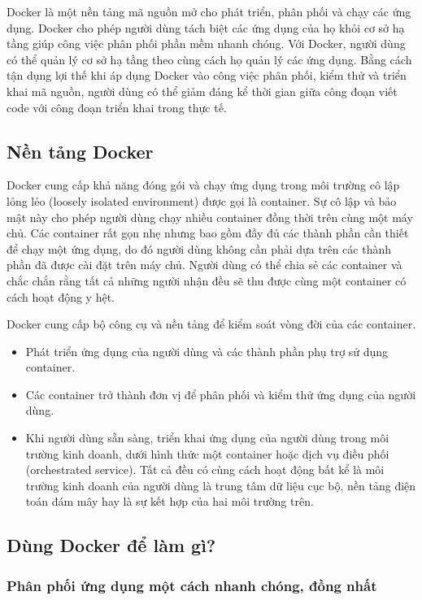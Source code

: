 Docker\autocite{docker} là một nền tảng mã nguồn mở cho phát triển, phân phối và chạy các ứng dụng. Docker cho phép người dùng tách biệt các ứng dụng của họ khỏi cơ sở hạ tầng giúp công việc phân phối phần mềm nhanh chóng. Với Docker, người dùng có thể quản lý cơ sở hạ tầng theo cùng cách họ quản lý các ứng dụng. Bằng cách tận dụng lợi thế khi áp dụng Docker vào công việc phân phối, kiểm thử và triển khai mã nguồn, người dùng có thể giảm đáng kể thời gian giữa công đoạn viết code với công đoạn triển khai trong thực tế.

\subsection{Nền tảng Docker}

Docker cung cấp khả năng đóng gói và chạy ứng dụng trong môi trường cô lập lỏng lẻo (loosely isolated environment) được gọi là container. Sự cô lập và bảo mật này cho phép người dùng chạy nhiều container đồng thời trên cùng một máy chủ. Các container rất gọn nhẹ nhưng bao gồm đầy đủ các thành phần cần thiết để chạy một ứng dụng, do đó người dùng không cần phải dựa trên các thành phần đã được cài đặt trên máy chủ. Người dùng có thể chia sẻ các container và chắc chắn rằng tất cả những người nhận đều sẽ thu được cùng một container có cách hoạt động y hệt.

Docker cung cấp bộ công cụ và nền tảng để kiểm soát vòng đời của các container.

\begin{itemize}
    \item Phát triển ứng dụng của người dùng và các thành phần phụ trợ sử dụng container.
    \item Các container trở thành đơn vị để phân phối và kiểm thử ứng dụng của người dùng.
    \item Khi người dùng sẵn sàng, triển khai ứng dụng của người dùng trong môi trường kinh doanh, dưới hình thức một container hoặc dịch vụ điều phối (orchestrated service). Tất cả đều có cùng cách hoạt động bất kể là môi trường kinh doanh của người dùng là trung tâm dữ liệu cục bộ, nền tảng điện toán đám mây hay là sự kết hợp của hai môi trường trên.
\end{itemize}

\subsection{Dùng Docker để làm gì?}

\subsubsection{Phân phối ứng dụng một cách nhanh chóng, đồng nhất}

